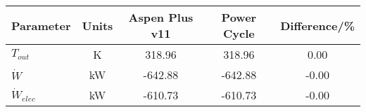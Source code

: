 \begin{tabular}{|p{2.5cm} c c c c|}
    \hline
    \rowcolor{bluepoli!40} %
    \textbf{Parameter} & \textbf{Units} & \textbf{Aspen Plus v11} & \textbf{Power Cycle} & \textbf{Difference/\unit{\percent}} \T\B \\
    \hline \hline
    \(T_{out}\) & \unit{\K} & 318.96 & 318.96 & 0.00 \T\B\\
    \(\Dot{W}\) & \unit{\kilo\watt} & -642.88 & -642.88 & -0.00 \T\B\\
    \(\Dot{W}_{elec}\) & \unit{\kilo\watt} & -610.73 & -610.73 & -0.00 \T\B\\
    \hline
\end{tabular}